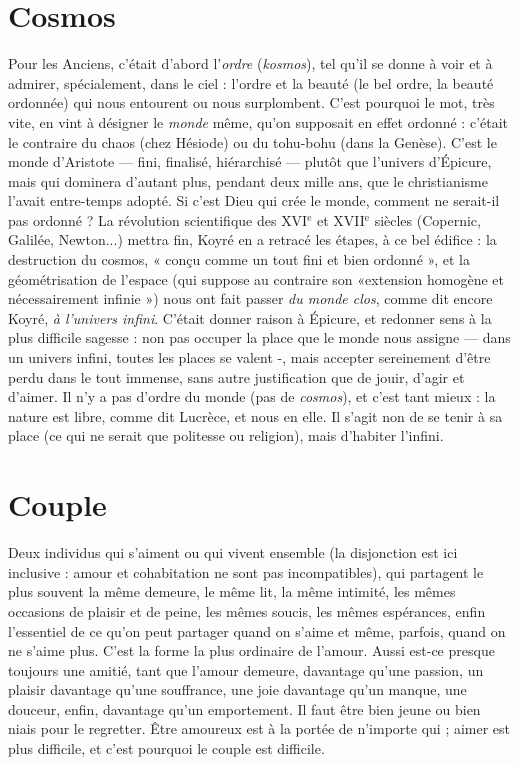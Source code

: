 \section{Cosmos}
Pour les Anciens, c'était d’abord l’{\it ordre} ({\it kosmos}), tel qu'il se
donne à voir et à admirer, spécialement, dans le ciel : l’ordre et
la beauté (le bel ordre, la beauté ordonnée) qui nous entourent ou nous surplombent.
C’est pourquoi le mot, très vite, en vint à désigner le {\it monde} même,
qu’on supposait en effet ordonné : c'était le contraire du chaos (chez Hésiode)
ou du tohu-bohu (dans la Genèse). C’est le monde d’Aristote — fini, finalisé,
hiérarchisé — plutôt que l’univers d’Épicure, mais qui dominera d’autant plus,
pendant deux mille ans, que le christianisme l’avait entre-temps adopté. Si c’est
Dieu qui crée le monde, comment ne serait-il pas ordonné ? La révolution
scientifique des {\footnotesize XVI$^\text{e}$} et {\footnotesize XVII$^\text{e}$}
siècles (Copernic, Galilée, Newton...) mettra fin,
Koyré en a retracé les étapes, à ce bel édifice : la destruction du cosmos, « conçu
comme un tout fini et bien ordonné », et la géométrisation de l’espace (qui
suppose au contraire son «extension homogène et nécessairement infinie »)
nous ont fait passer {\it du monde clos}, comme dit encore Koyré, {\it à l'univers infini}.
C'était donner raison à Épicure, et redonner sens à la plus difficile sagesse : non
pas occuper la place que le monde nous assigne — dans un univers infini, toutes
les places se valent -, mais accepter sereinement d’être perdu dans le tout
immense, sans autre justification que de jouir, d’agir et d’aimer. Il n’y a pas
d'ordre du monde (pas de {\it cosmos}), et c’est tant mieux : la nature est libre,
comme dit Lucrèce, et nous en elle. Il s’agit non de se tenir à sa place (ce qui
ne serait que politesse ou religion), mais d’habiter l'infini.

\section{Couple}
Deux individus qui s’aiment ou qui vivent ensemble (la disjonction
est ici inclusive : amour et cohabitation ne sont pas incompatibles),
qui partagent le plus souvent la même demeure, le même lit, la même
intimité, les mêmes occasions de plaisir et de peine, les mêmes soucis, les
mêmes espérances, enfin l'essentiel de ce qu’on peut partager quand on s’aime
et même, parfois, quand on ne s'aime plus. C’est la forme la plus ordinaire de
l'amour. Aussi est-ce presque toujours une amitié, tant que l’amour demeure,
davantage qu’une passion, un plaisir davantage qu’une souffrance, une joie
davantage qu’un manque, une douceur, enfin, davantage qu’un emportement.
Il faut être bien jeune ou bien niais pour le regretter. Être amoureux est à la
portée de n'importe qui ; aimer est plus difficile, et c’est pourquoi le couple est
difficile.


